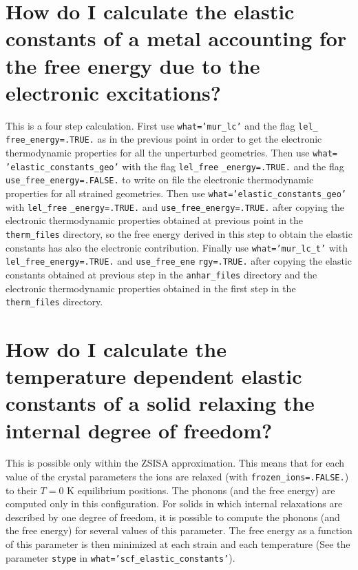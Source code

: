 \documentclass[12pt,a4paper,twoside]{report}
\begin{document}
\newpage
{\color{coral}\section{How do I calculate the elastic constants of a metal
accounting for the free energy due to the electronic excitations?}}
\color{black}
This is a four step calculation. First use \texttt{what='mur\_lc'} and
the flag \texttt{lel\_} \texttt{free\_energy=.TRUE.} as in the previous point
in order to get the electronic thermodynamic properties for all the 
unperturbed geometries. Then use \texttt{what=} \texttt{'elastic\_constants\_geo'}
with the flag \texttt{lel\_free} \texttt{\_energy=.TRUE.} and the flag
\texttt{use\_free\_energy=.FALSE.} to write on file the electronic
thermodynamic properties for all strained geometries. Then use
\texttt{what='elastic\_constants\_geo'} with \texttt{lel\_free}
\texttt{\_energy=.TRUE.}
and \texttt{use\_free\_energy=.TRUE.} after copying the electronic
thermodynamic properties obtained at previous point in the 
\texttt{therm\_files} directory, so the 
free energy derived in this step to obtain the elastic constants 
has also the electronic contribution. 
Finally use \texttt{what='mur\_lc\_t'} with \texttt{lel\_free\_energy=.TRUE.}
and \texttt{use\_free\_ene} \texttt{rgy=.TRUE.} after copying the elastic
constants obtained at previous step in the \texttt{anhar\_files} directory
and the electronic thermodynamic properties obtained in the first 
step in the \texttt{therm\_files} directory.

\newpage
{\color{coral}\section{How do I calculate the temperature dependent
elastic constants of a solid relaxing the internal degree of freedom?}}
\color{black}
This is possible only within the ZSISA approximation. This
means that for each value of the crystal parameters the ions are
relaxed (with \texttt{frozen\_ions=.FALSE.}) to their $T=0$ K equilibrium
positions. The phonons (and the free energy) are computed only in this
configuration.
For solids in which internal relaxations are described by one degree of 
freedom, it is possible to compute the phonons (and the free energy) for
several values of this parameter. The free energy as a function of this
parameter is then minimized at each strain and each temperature 
(See the parameter \texttt{stype} in \texttt{what='scf\_elastic\_constants'}).
\end{document}
